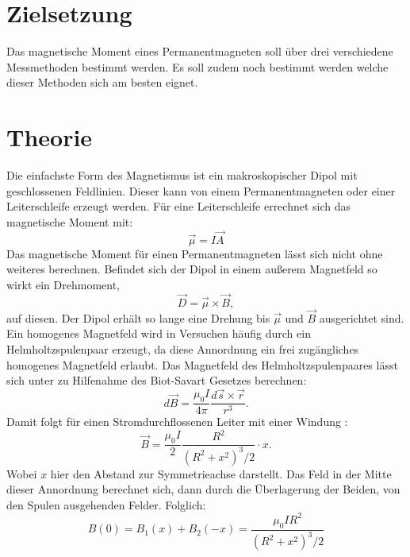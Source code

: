\section{Zielsetzung}
Das magnetische Moment eines Permanentmagneten soll über drei verschiedene Messmethoden bestimmt werden.
Es soll zudem noch bestimmt werden welche dieser Methoden sich am besten eignet.
\section{Theorie}
\label{sec:Theorie}
Die einfachste Form des Magnetismus ist ein makroskopischer Dipol mit geschlossenen Feldlinien.
Dieser kann von einem Permanentmagneten oder einer Leiterschleife erzeugt werden.
Für eine Leiterschleife errechnet sich das magnetische Moment mit:
\begin{equation}
  \vec{\mu} = I \vec{A}
\end{equation}
Das magnetische Moment für einen Permanentmagneten lässt sich nicht ohne weiteres berechnen.
Befindet sich der Dipol in einem außerem Magnetfeld so wirkt ein Drehmoment,
\begin{equation}
  \vec{D} = \vec{\mu}\times \vec{B} ,
\end{equation}
auf diesen.
Der Dipol erhält so lange eine Drehung bis $\vec{\mu}$ und $\vec{B}$ ausgerichtet sind.
Ein homogenes Magnetfeld wird in Versuchen häufig durch ein Helmholtzspulenpaar erzeugt, da diese Annordnung ein frei zugängliches homogenes Magnetfeld erlaubt.
Das Magnetfeld des Helmholtzspulenpaares lässt sich unter zu Hilfenahme des Biot-Savart Gesetzes berechnen:
\begin{equation}
d \vec{B}= \frac{\mu_0 I}{4 \pi} \frac{d\vec{s}\times \vec{r}}{r^3} .
\end{equation}
Damit folgt für einen Stromdurchflossenen Leiter mit einer Windung :
\begin{equation}
  \vec{B}=\frac{\mu_0 I}{2} \frac{R^2}{(R^2 + x^2)^3/2 } \cdot x .
\end{equation}
Wobei $x$ hier den Abstand zur Symmetrieachse darstellt.
Das Feld in der Mitte dieser Annordnung berechnet sich, dann durch die Überlagerung der Beiden, von den Spulen ausgehenden Felder.
Folglich:
\begin{equation}
  B(0)= B_1(x)+B_2(-x) = \frac{\mu_0 I R^2}{(R^2+x^2)^3/2}
\end{equation}
